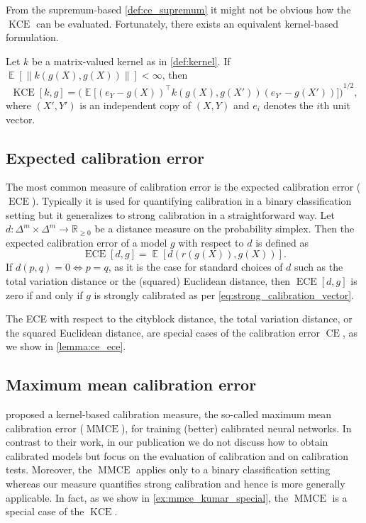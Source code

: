 \documentclass{article}
\DeclareMathOperator{\Expect}{\mathbb{E}}
\DeclareMathOperator{\ECE}{ECE}
\DeclareMathOperator{\measure}{CE}
\DeclareMathOperator{\kernelmeasure}{KCE}
\DeclareMathOperator{\MMCE}{MMCE}
\begin{document}
From the supremum-based \cref{def:ce_supremum} it might not be obvious how the
$\kernelmeasure$ can be evaluated. Fortunately, there exists an equivalent
kernel-based formulation.

\begin{lemma}
  Let $k$ be a matrix-valued kernel as in \cref{def:kernel}. If
  $\Expect[\|k(g(X),g(X))\|] < \infty$, then
  \begin{equation}\label{eq:ce2}
    \kernelmeasure[k,g] = {\Big(\Expect\big[{(e_Y - g(X))}^{\intercal} k(g(X), g(X')) {(e_{Y'} - g(X'))}\big]\Big)}^{1/2},
  \end{equation}
  where $(X', Y')$ is an independent copy of $(X,Y)$ and $e_i$ denotes the $i$th unit vector.
\end{lemma}

\subsection{Expected calibration error}

The most common measure of calibration error is the expected calibration error
($\ECE$). Typically it is used for quantifying calibration in a binary
classification setting but it generalizes to strong calibration in a
straightforward way. Let
$d \colon \Delta^m \times \Delta^m \to \mathbb{R}_{\geq 0}$ be a distance measure
on the probability simplex. Then the expected calibration error of a model $g$
with respect to $d$ is defined as
\begin{equation}\label{eq:ece_def}
  \ECE[d,g] = \Expect[d(r(g(X)), g(X))].
\end{equation}
If $d(p, q) = 0 \Leftrightarrow p = q$, as it is the case for standard choices
of $d$ such as the total variation distance or the (squared) Euclidean distance,
then $\ECE[d,g]$ is zero if and only if $g$ is strongly calibrated as per
\cref{eq:strong_calibration_vector}.

The ECE with respect to the cityblock distance, the total variation distance, or
the squared Euclidean distance, are special cases of the calibration error
$\measure$, as we show in \cref{lemma:ce_ece}.

\subsection{Maximum mean calibration error}

 proposed a kernel-based
calibration measure, the so-called maximum mean calibration error ($\MMCE$), for
training (better) calibrated neural networks. In contrast to their work, in our
publication we do not discuss how to obtain calibrated models but focus on the
evaluation of calibration and on calibration tests. Moreover, the $\MMCE$
applies only to a binary classification setting whereas our measure quantifies
strong calibration and hence is more generally applicable. In fact, as we show
in \cref{ex:mmce_kumar_special}, the $\MMCE$ is a special case of the
$\kernelmeasure$.
\end{document}
